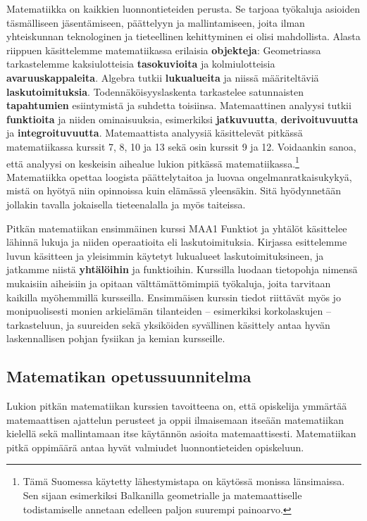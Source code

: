 Matematiikka on kaikkien luonnontieteiden perusta. Se tarjoaa työkaluja asioiden täsmälliseen jäsentämiseen, päättelyyn ja mallintamiseen, joita ilman yhteiskunnan teknologinen ja tieteellinen kehittyminen ei olisi mahdollista. Alasta riippuen käsittelemme matematiikassa erilaisia \textbf{objekteja}: Geometriassa tarkastelemme kaksiulotteisia \textbf{tasokuvioita} ja kolmiulotteisia \textbf{avaruuskappaleita}. Algebra tutkii \textbf{lukualueita} ja niissä määriteltäviä \textbf{laskutoimituksia}. Todennäköisyyslaskenta tarkastelee satunnaisten \textbf{tapahtumien} esiintymistä ja suhdetta toisiinsa. Matemaattinen analyysi tutkii \textbf{funktioita} ja niiden ominaisuuksia, esimerkiksi \textbf{jatkuvuutta}, \textbf{derivoituvuutta} ja \textbf{integroituvuutta}. Matemaattista analyysiä käsittelevät pitkässä matematiikassa kurssit 7, 8, 10 ja 13 sekä osin kurssit 9 ja 12. Voidaankin sanoa, että analyysi on keskeisin aihealue lukion pitkässä matematiikassa.\footnote[1]{Tämä Suomessa käytetty lähestymistapa on käytössä monissa länsimaissa. Sen sijaan esimerkiksi Balkanilla geometrialle ja matemaattiselle todistamiselle annetaan edelleen paljon suurempi painoarvo.} Matematiikka opettaa loogista päättelytaitoa ja luovaa ongelmanratkaisukykyä, mistä on hyötyä niin opinnoissa kuin elämässä yleensäkin. Sitä hyödynnetään jollakin tavalla jokaisella tieteenalalla ja myös taiteissa. 

Pitkän matematiikan ensimmäinen kurssi MAA1 Funktiot ja yhtälöt käsittelee lähinnä lukuja ja niiden operaatioita eli laskutoimituksia. Kirjassa esittelemme luvun käsitteen ja yleisimmin käytetyt lukualueet laskutoimituksineen, ja jatkamme niistä \textbf{yhtälöihin} ja funktioihin. Kurssilla luodaan tietopohja nimensä mukaisiin aiheisiin ja opitaan välttämättömimpiä työkaluja, joita tarvitaan kaikilla myöhemmillä kursseilla. Ensimmäisen kurssin tiedot riittävät myös jo monipuolisesti monien arkielämän tilanteiden -- esimerkiksi korkolaskujen -- tarkasteluun, ja suureiden sekä yksiköiden syvällinen käsittely antaa hyvän laskennallisen pohjan fysiikan ja kemian kursseille.

\newpage
\subsection*{Matematikan opetussuunnitelma}

Lukion pitkän matematiikan kurssien tavoitteena on, että opiskelija ymmärtää matemaattisen ajattelun perusteet ja oppii ilmaisemaan itseään matematiikan kielellä sekä mallintamaan itse käytännön asioita matemaattisesti. Matematiikan pitkä oppimäärä antaa hyvät valmiudet luonnontieteiden opiskeluun.

